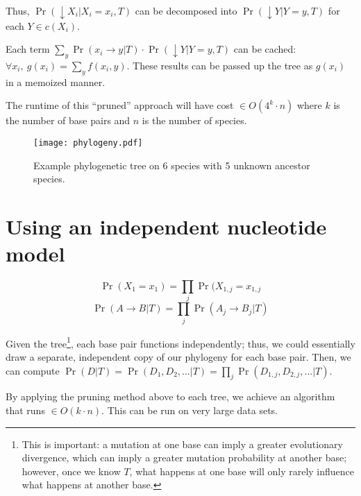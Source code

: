 \documentclass[12pt]{book}
\begin{document}
Thus, $\Pr(\downarrow X_i | X_i=x_i, T)$ can be decomposed into
$\Pr(\downarrow Y | Y=y, T)$ for each $Y \in c(X_i)$.

Each term $\sum_y \Pr(x_i \rightarrow y | T) \cdot \Pr(\downarrow Y |
Y=y, T)$ can be cached: $\forall x_i,~ g(x_i) = \sum_y f(x_i,
y)$. These results can be passed up the tree as $g(x_i)$ in a memoized
manner.

The runtime of this ``pruned'' approach will have cost $\in O(4^k \cdot n)$
where $k$ is the number of base pairs and $n$ is the number of
species.


\begin{figure*}
  \centering
  \texttt{[image: phylogeny.pdf]}
  \caption{{Example phylogenetic tree on 6 species with 5 unknown ancestor species.} 
  \label{fig:phylogeny}}
\end{figure*}

\section{Using an independent nucleotide model}

\[ \Pr(X_1=x_1) = \prod_j \Pr(X_{1,j} = x_{1,j} \]
\[ \Pr(A \rightarrow B | T) = \prod_j \Pr(A_j \rightarrow B_j | T) \]

Given the tree\footnote{This is important: a mutation at one base can
  imply a greater evolutionary divergence, which can imply a greater
  mutation probability at another base; however, once we know $T$,
  what happens at one base will only rarely influence what happens at
  another base.}, each base pair functions independently; thus, we
could essentially draw a separate, independent copy of our phylogeny
for each base pair. Then, we can compute $\Pr(D | T) = \Pr(D_1, D_2,
\ldots | T) = \prod_j \Pr(D_{1,j}, D_{2,j}, \ldots |T)$.

By applying the pruning method above to each tree, we achieve an algorithm that runs $\in O(k \cdot n)$. This can be run on very large data sets.
\end{document}
